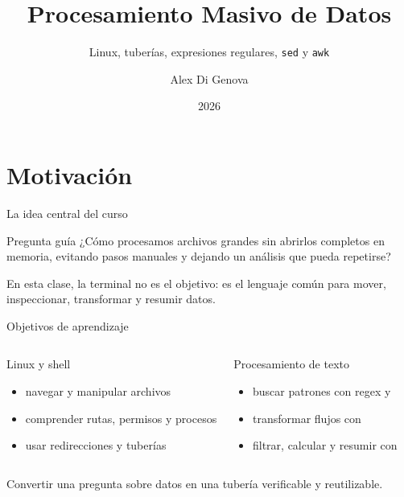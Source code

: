 \documentclass[aspectratio=169,11pt]{beamer}
\title[Procesamiento Masivo de Datos]{Procesamiento Masivo de Datos}
\subtitle{Linux, tuberías, expresiones regulares, \texttt{sed} y \texttt{awk}}
\author{Alex Di Genova}
\institute{Universidad de O'Higgins}
\date{2026}
\begin{document}
\titleframe

\section{Motivación}

\begin{frame}[fragile]{La idea central del curso}
  \centering
  \vspace{3mm}
  \hfill
  \hfill
  \vspace{8mm}
  \begin{wideblock}{Pregunta guía}
    ¿Cómo procesamos archivos grandes \alert{sin abrirlos completos en memoria}, evitando pasos manuales y dejando un análisis que pueda repetirse?
  \end{wideblock}
  \vfill
  \small\color{Slate}En esta clase, la terminal no es el objetivo: es el lenguaje común para mover, inspeccionar, transformar y resumir datos.
\end{frame}

\begin{frame}[fragile]{Objetivos de aprendizaje}
  \begin{columns}[T,onlytextwidth]
      \begin{wideblock}{Linux y shell}
        \begin{itemize}
          \item navegar y manipular archivos
          \item comprender rutas, permisos y procesos
          \item usar redirecciones y tuberías
        \end{itemize}
      \end{wideblock}
      \begin{wideblock}{Procesamiento de texto}
        \begin{itemize}
          \item buscar patrones con regex y 
          \item transformar flujos con 
          \item filtrar, calcular y resumir con 
        \end{itemize}
      \end{wideblock}
  \end{columns}
  \vspace{5mm}
  \centering{}\quad Convertir una pregunta sobre datos en una tubería verificable y reutilizable.
\end{frame}
\end{document}
